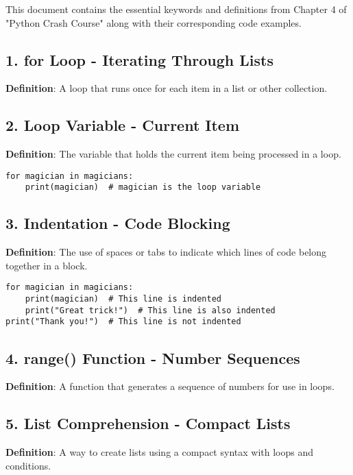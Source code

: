 
This document contains the essential keywords and definitions from Chapter 4 of "Python Crash Course" along with their corresponding code examples.

\subsection*{1. for Loop - Iterating Through Lists}
\textbf{Definition}: A loop that runs once for each item in a list or other collection.



\subsection*{2. Loop Variable - Current Item}
\textbf{Definition}: The variable that holds the current item being processed in a loop.

\begin{lstlisting}
for magician in magicians:
    print(magician)  # magician is the loop variable
\end{lstlisting}

\subsection*{3. Indentation - Code Blocking}
\textbf{Definition}: The use of spaces or tabs to indicate which lines of code belong together in a block.

\begin{lstlisting}
for magician in magicians:
    print(magician)  # This line is indented
    print("Great trick!")  # This line is also indented
print("Thank you!")  # This line is not indented
\end{lstlisting}

\subsection*{4. range() Function - Number Sequences}
\textbf{Definition}: A function that generates a sequence of numbers for use in loops.



\subsection*{5. List Comprehension - Compact Lists}
\textbf{Definition}: A way to create lists using a compact syntax with loops and conditions.

